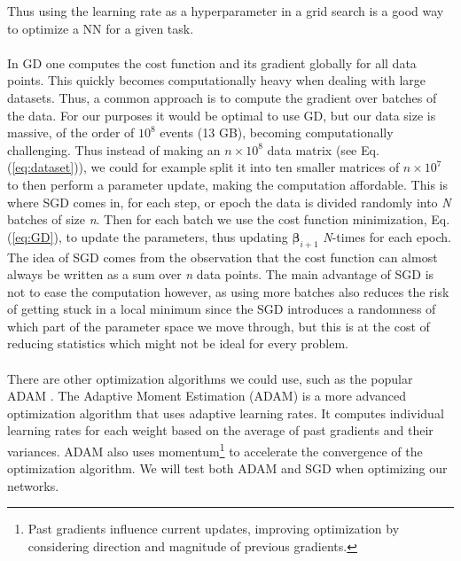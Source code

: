\documentclass[12pt, a4paper]{book}
\begin{document}
Thus using the learning rate as a hyperparameter in a grid search is a good way to optimize a NN for a given task.\\
\\In GD one computes the cost function and its gradient globally for all data points. This quickly becomes computationally heavy when dealing with large datasets. Thus, a common approach is to compute the gradient over batches of the data. 
For our purposes it would be optimal to use GD, but our data size is massive, of the order of $10^{8}$ events (13 GB), becoming computationally challenging. Thus instead of making an $n\times10^8$ data matrix (see Eq. (\ref{eq:dataset})), 
we could for example split it into ten smaller matrices of $n\times10^7$ to then perform a parameter update, making the computation affordable. This is where SGD comes in, for each step, or epoch the data is divided randomly into 
\textit{N} batches of size \textit{n}. Then for each batch we use the cost function minimization, Eq. (\ref{eq:GD}), to update the parameters, thus updating $\bm{\beta}_{i+1}$ \textit{N}-times for each epoch. The idea of SGD comes from the observation that the 
cost function can almost always be written as a sum over \textit{n} data points. The main advantage of SGD is not to ease the computation however, as using more batches also reduces the risk of getting stuck in a local minimum since the SGD introduces a randomness of which part of the parameter space we move through, 
but this is at the cost of reducing statistics which might not be ideal for every problem.\\
\\There are other optimization algorithms we could use, such as the popular ADAM \cite{kingma2017adam}. The Adaptive Moment Estimation (ADAM) is a more advanced optimization algorithm that uses adaptive learning rates. It computes individual learning rates for each weight based on the average of past gradients 
and their variances. ADAM also uses momentum\footnote{Past gradients influence current updates, improving optimization by considering direction and magnitude of previous gradients.} to accelerate the convergence of the optimization algorithm. We will test both ADAM and SGD when optimizing our networks.
\end{document}
